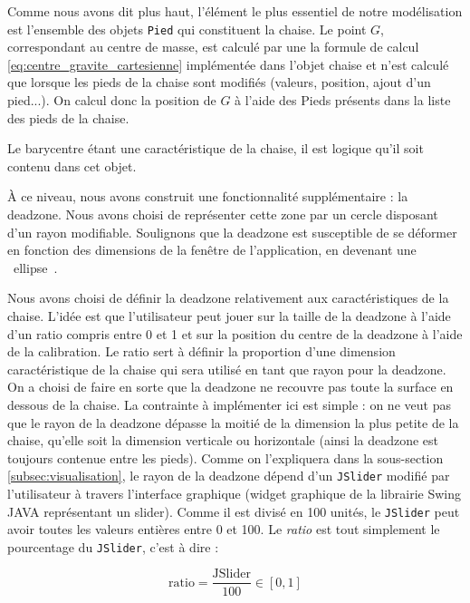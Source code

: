 \documentclass{polytech/polytech}
\begin{document}
Comme nous avons dit plus haut, l'élément le plus essentiel de notre modélisation est l'ensemble des objets \texttt{Pied} qui constituent la chaise.
Le point $G$, correspondant au centre de masse, est calculé par une la formule de calcul \eqref{eq:centre_gravite_cartesienne} implémentée dans l'objet chaise et n'est calculé que lorsque les pieds de la chaise sont modifiés (valeurs, position, ajout d'un pied...). On calcul donc la position de $G$ à l'aide des Pieds présents dans la liste des pieds de la chaise.

Le barycentre étant une caractéristique de la chaise, il est logique qu'il soit contenu dans cet objet.

À ce niveau, nous avons construit une fonctionnalité supplémentaire : la deadzone.
Nous avons choisi de représenter cette zone par un cercle disposant d'un rayon modifiable.
Soulignons que la deadzone est susceptible de se déformer en fonction des dimensions de la fenêtre de l'application, en devenant une \guillemotleft ~ellipse~\guillemotright .

Nous avons choisi de définir la deadzone relativement aux caractéristiques de la chaise. L'idée est que l'utilisateur peut jouer sur la taille de la deadzone à l'aide d'un ratio compris entre 0 et 1 et sur la position du centre de la deadzone à l'aide de la calibration. 
Le ratio sert à définir la proportion d'une dimension caractéristique de la chaise qui sera utilisé en tant que rayon pour la deadzone. 
On a choisi de faire en sorte que la deadzone ne recouvre pas toute la surface en dessous de la chaise. 
La contrainte à implémenter ici est simple : on ne veut pas que le rayon de la deadzone dépasse la moitié de la dimension la plus petite de la chaise, qu'elle soit la dimension verticale ou horizontale (ainsi la deadzone est toujours contenue entre les pieds).
Comme on l'expliquera dans la sous-section \ref{subsec:visualisation}, le rayon de la deadzone dépend d'un \texttt{JSlider} modifié par l'utilisateur à travers l'interface graphique (widget graphique de la librairie Swing JAVA représentant un slider).
Comme il est divisé en 100 unités, le \texttt{JSlider} peut avoir toutes les valeurs entières entre 0 et 100. Le \textit{ratio} est tout simplement le pourcentage du \texttt{JSlider}, c'est à dire :

$$\mathrm{ratio} = \frac{\mathrm{JSlider}}{100} \in [0, 1]$$
\end{document}
